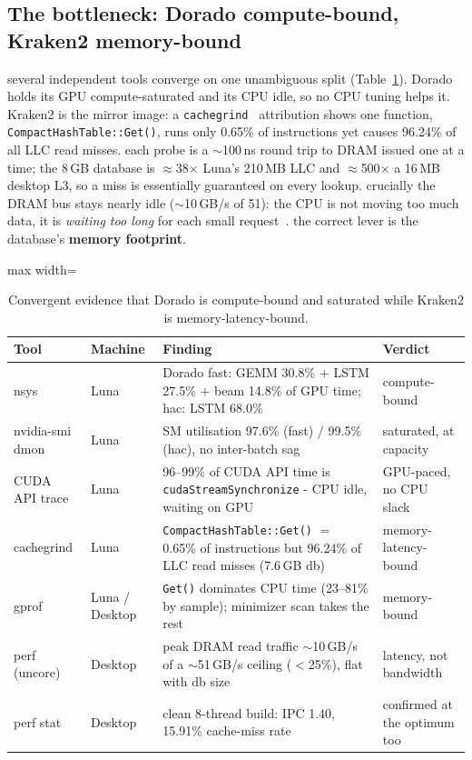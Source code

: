 \documentclass[10.5pt]{article}
\newcommand{\code}[1]{\texttt{\footnotesize #1}}
\begin{document}
\subsection{The bottleneck: Dorado compute-bound, Kraken2 memory-bound}
several independent tools converge on one unambiguous split (Table~\ref{tab:evidence}). Dorado holds its GPU compute-saturated and its CPU idle, so no CPU tuning helps it. Kraken2 is the mirror image: a \code{cachegrind}~\cite{valgrind} attribution shows one function, \code{CompactHashTable::Get()}, runs only 0.65\% of instructions yet causes 96.24\% of all LLC read misses. each probe is a $\sim$100\,ns round trip to DRAM issued one at a time; the 8\,GB database is $\approx$38$\times$ Luna's 210\,MB LLC and $\approx$500$\times$ a 16\,MB desktop L3, so a miss is essentially guaranteed on every lookup. crucially the DRAM bus stays nearly idle ($\sim$10\,GB/s of 51): the CPU is not moving too much data, it is \textit{waiting too long} for each small request~\cite{roofline}. the correct lever is the database's \textbf{memory footprint}.

\begin{table}[h!]
\centering\footnotesize
\caption{Convergent evidence that Dorado is compute-bound and saturated while Kraken2 is memory-latency-bound.}
\label{tab:evidence}
\begin{adjustbox}{max width=\textwidth}
\begin{tabular}{@{}p{1.9cm}p{1.5cm}p{8.3cm}p{2.4cm}@{}}
\toprule
\textbf{Tool} & \textbf{Machine} & \textbf{Finding} & \textbf{Verdict} \\
\midrule
nsys & Luna & Dorado fast: GEMM 30.8\% $+$ LSTM 27.5\% $+$ beam 14.8\% of GPU time; hac: LSTM 68.0\% & compute-bound \\
nvidia-smi dmon & Luna & SM utilisation 97.6\% (fast) / 99.5\% (hac), no inter-batch sag & saturated, at capacity \\
CUDA API trace & Luna & 96--99\% of CUDA API time is \code{cudaStreamSynchronize} - CPU idle, waiting on GPU & GPU-paced, no CPU slack \\
cachegrind & Luna & \code{CompactHashTable::Get()} $=$ 0.65\% of instructions but 96.24\% of LLC read misses (7.6\,GB db) & memory-latency-bound \\
gprof & Luna / Desktop & \code{Get()} dominates CPU time (23--81\% by sample); minimizer scan takes the rest & memory-bound \\
perf (uncore) & Desktop & peak DRAM read traffic $\sim$10\,GB/s of a $\sim$51\,GB/s ceiling ($<$25\%), flat with db size & latency, not bandwidth \\
perf stat & Desktop & clean 8-thread build: IPC 1.40, 15.91\% cache-miss rate & confirmed at the optimum too \\
\bottomrule
\end{tabular}
\end{adjustbox}
\end{table}
\end{document}
